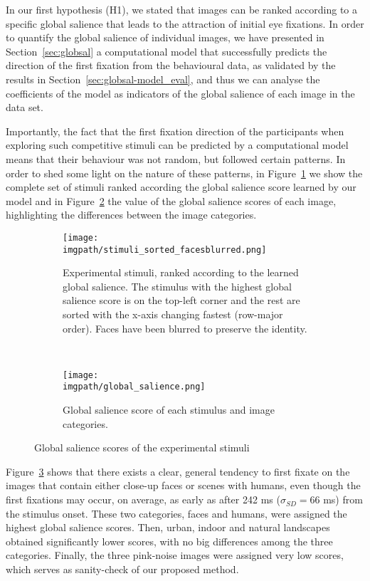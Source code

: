 {In our first hypothesis (H1), we stated that images can be ranked according to a specific global salience that leads to the attraction of initial eye fixations. In order to quantify the global salience of individual images, we have presented in Section~\ref{sec:globsal} a computational model that successfully predicts the direction of the first fixation from the behavioural data, as validated by the results in Section~\ref{sec:globsal-model_eval}, and thus we can analyse the coefficients of the model as indicators of the global salience of each image in the data set.

Importantly, the fact that the first fixation direction of the participants when exploring such competitive stimuli can be predicted by a computational model means that their behaviour was not random, but followed certain patterns. In order to shed some light on the nature of these patterns, in Figure~\ref{fig:globsal-stimuli_sorted} we show the complete set of stimuli ranked according the global salience score learned by our model and in Figure~\ref{fig:globsal-global_salience_categories} the value of the global salience scores of each image, highlighting the differences between the image categories.

\begin{figure}[ht]
  \centering
  \begin{subfigure}{\linewidth}
      \texttt{[image: \\imgpath/stimuli\_sorted\_facesblurred.png]}
      \caption{Experimental stimuli, ranked according to the learned global salience. The stimulus with the highest global salience score is on the top-left corner and the rest are sorted with the x-axis changing fastest (row-major order). Faces have been blurred to preserve the identity.}
    \label{fig:globsal-stimuli_sorted}
  \end{subfigure}
  \\
  \begin{subfigure}{\linewidth}
      \centering
      \texttt{[image: \\imgpath/global\_salience.png]}
      \caption{Global salience score of each stimulus and image categories.}
    \label{fig:globsal-global_salience_categories}
  \end{subfigure}
  \caption{Global salience scores of the experimental stimuli}
\label{fig:globsal-global_salience}
\end{figure}

Figure~\ref{fig:globsal-global_salience} shows that there exists a clear, general tendency to first fixate on the images that contain either close-up faces or scenes with humans, even though the first fixations may occur, on average, as early as after 242 ms ($\sigma_{SD} = 66$ ms) from the stimulus onset. These two categories, faces and humans, were assigned the highest global salience scores. Then, urban, indoor and natural landscapes obtained significantly lower scores, with no big differences among the three categories. Finally, the three pink-noise images were assigned very low scores, which serves as sanity-check of our proposed method.

}
